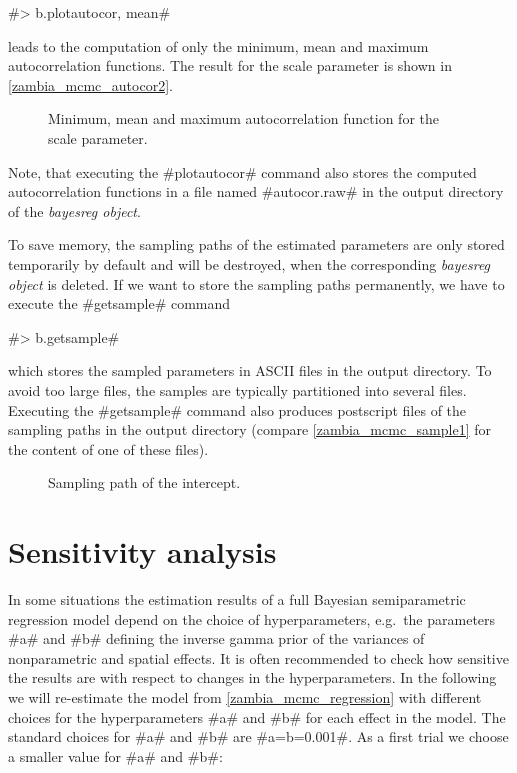 \documentclass[11pt,a4paper,twoside]{bayesxreport}
\begin{document}
#> b.plotautocor, mean#

leads to the computation of only the minimum, mean and maximum
autocorrelation functions. The result for the scale parameter is
shown in \autoref{zambia_mcmc_autocor2}.

\begin{figure}[ht]
\begin{center}
{\it\caption{Minimum, mean and maximum autocorrelation function for
the scale parameter.\label{zambia_mcmc_autocor2}}}
\end{center}
\end{figure}

Note, that executing the #plotautocor# command also stores the
computed autocorrelation functions in a file named #autocor.raw# in
the output directory of the {\it bayesreg object}.

To save memory, the sampling paths of the estimated parameters are
only stored temporarily by default and will be destroyed, when the
corresponding {\em bayesreg object} is deleted. If we want to store
the sampling paths permanently, we have to execute the #getsample#
command

#> b.getsample#

which stores the sampled parameters in ASCII files in the output
directory. To avoid too large files, the samples are typically
partitioned into several files. Executing the #getsample# command
also produces postscript files of the sampling paths in the output
directory (compare \autoref{zambia_mcmc_sample1} for the content of
one of these files).

\begin{figure}[ht]
\begin{center}
{\it\caption{Sampling path of the
intercept.\label{zambia_mcmc_sample1}}}
\end{center}
\end{figure}

\section{Sensitivity analysis}\label{zambia_mcmc_sensitivity}

In some situations the estimation results of a full Bayesian
semiparametric regression model depend on the choice of
hyperparameters, e.g.~the parameters #a# and #b# defining the
inverse gamma prior of the variances of nonparametric and spatial
effects. It is often recommended to check how sensitive the results
are with respect to changes in the hyperparameters. In the following
we will re-estimate the model from \autoref{zambia_mcmc_regression}
with different choices for the hyperparameters #a# and #b# for each
effect in the model. The standard choices for #a# and #b# are
#a=b=0.001#. As a first trial we choose a smaller value for #a# and
#b#:
\end{document}
